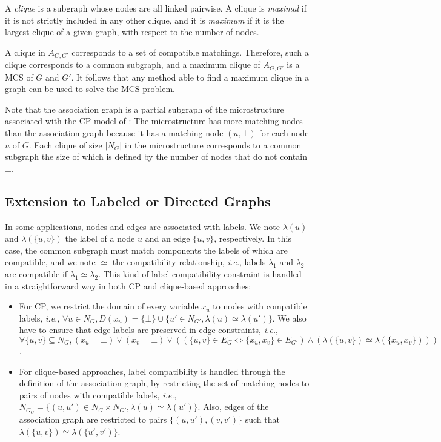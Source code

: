 \documentclass{llncs}
\begin{document}
A \emph{clique} is a subgraph whose nodes are all linked pairwise.  A clique is \emph{maximal} if it
is not strictly included in any other clique, and it is \emph{maximum} if it is the largest clique
of a given graph, with respect to the number of nodes.

A clique in $A_{G,G'}$ corresponds to a set of compatible matchings. Therefore, such a clique
corresponds to a common subgraph, and a maximum clique of $A_{G,G'}$ is a MCS of $G$ and $G'$.  It
follows that any method able to find a maximum clique in a graph can be used to solve the MCS
problem.

Note that the association graph is a partial subgraph of the microstructure
\cite{DBLP:conf/aaai/Jegou93a} associated with the CP model of  \cite{DBLP:conf/mco/VismaraV08}: The
microstructure has more matching nodes than the association graph because it has a matching node
$(u,\bot)$ for each node $u$ of $G$. Each clique of size $|N_G|$ in the microstructure corresponds
to a common subgraph the size of which is defined by the number of nodes that do not contain $\bot$.


\subsection{Extension to Labeled or Directed Graphs}\label{extension}

In some applications, nodes and edges are associated with labels. We note $\lambda(u)$ and
$\lambda(\{u,v\})$ the label of a node $u$ and an edge $\{u,v\}$, respectively. In this case, the
common  subgraph must match components the labels of which are compatible, and we note $\simeq$ the
compatibility relationship, {\em i.e.}, labels $\lambda_1$ and $\lambda_2$ are compatible if
$\lambda_1\simeq\lambda_2$. This kind of label compatibility constraint is handled in a
straightforward way in both CP and clique-based approaches:

\begin{itemize}
\item For CP, we restrict the domain of every variable $x_u$ to nodes with compatible labels, {\em
    i.e.}, $\forall u\in N_G, D(x_u) = \{\bot\}\cup \{u'\in N_{G'}, \lambda(u)\simeq\lambda(u')\}$.
    We also have to ensure that edge labels are preserved in edge constraints, {\em i.e.}, $\forall
    \{u,v\}\subseteq N_G, (x_u=\bot)\vee (x_v=\bot) \vee ((\{u,v\}\in E_G\Leftrightarrow
    \{x_u,x_v\}\in E_{G'}) \wedge (\lambda(\{u,v\}) \simeq \lambda(\{x_u,x_v\})))$.

\item For clique-based approaches, label compatibility is handled through the definition of the
    association graph, by restricting the set of matching nodes to pairs of nodes with compatible
    labels, {\em i.e.}, $N_{G_C} = \{(u,u')\in N_G\times N_{G'}, \lambda(u)\simeq\lambda(u')\}$.
    Also, edges of the association graph are restricted to pairs $\{(u,u'),(v,v')\}$ such that
    $\lambda(\{u,v\}) \simeq \lambda(\{u',v')\}$.
\end{itemize}
\end{document}
